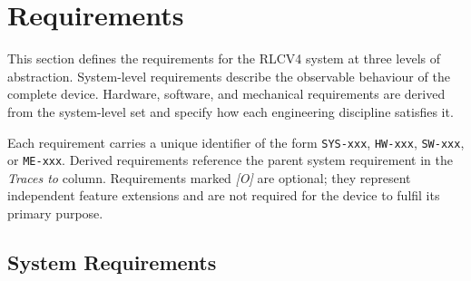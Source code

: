 \section{Requirements}
\label{sec:requirements}

This section defines the requirements for the RLCV4 system at three levels of abstraction.
System-level requirements describe the observable behaviour of the complete device.
Hardware, software, and mechanical requirements are derived from the system-level set and specify how each engineering discipline satisfies it.

Each requirement carries a unique identifier of the form \texttt{SYS-xxx}, \texttt{HW-xxx}, \texttt{SW-xxx}, or \texttt{ME-xxx}.
Derived requirements reference the parent system requirement in the \emph{Traces to} column.
Requirements marked \textit{[O]} are optional; they represent independent feature extensions and are not required for the device to fulfil its primary purpose.

\subsection{System Requirements}
\label{sec:req_system}

